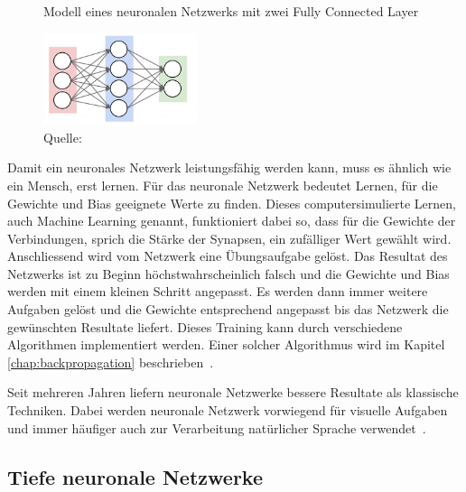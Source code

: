 \begin{figure}[h!]
    \captionsetup{width=.9\linewidth}
    \caption{Modell eines neuronalen Netzwerks mit zwei Fully Connected Layer}
    \label{fig:cs231-nn}
    \centering
    \includegraphics[width=0.4\textwidth]{graphics/cs231-nn.jpg}
    \vspace*{0.3cm}
    \caption*{Quelle: \textcite{cs231NN}}
\end{figure}

Damit ein neuronales Netzwerk leistungsfähig werden kann, muss es ähnlich wie ein Mensch, erst lernen. Für das neuronale Netzwerk bedeutet Lernen, für die Gewichte und Bias geeignete Werte zu finden. Dieses computersimulierte Lernen, auch Machine Learning genannt, funktioniert dabei so, dass für die Gewichte der Verbindungen, sprich die Stärke der Synapsen, ein zufälliger Wert gewählt wird. Anschliessend wird vom Netzwerk eine Übungsaufgabe gelöst. Das Resultat des Netzwerks ist zu Beginn höchstwahrscheinlich falsch und die Gewichte und Bias werden mit einem kleinen Schritt angepasst. Es werden dann immer weitere Aufgaben gelöst und die Gewichte entsprechend angepasst bis das Netzwerk die gewünschten Resultate liefert.
Dieses Training kann durch verschiedene Algorithmen implementiert werden. Einer solcher Algorithmus wird im Kapitel \ref{chap:backpropagation} beschrieben~\autocite{Krogh2008}.

Seit mehreren Jahren liefern neuronale Netzwerke bessere Resultate als klassische Techniken. Dabei werden neuronale Netzwerk vorwiegend für visuelle Aufgaben und immer häufiger auch zur Verarbeitung natürlicher Sprache verwendet~\autocite{Olah2014b}.



\subsection{Tiefe neuronale Netzwerke}
\label{chap:deep-neural-nets}

